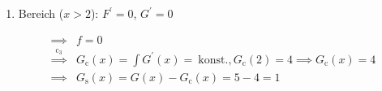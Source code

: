 \begin{solution}
\begin{enumerate}[label = \arabic*.]
    \item Bereich ($x > 2$):
    $F^\prime = 0$, $G^\prime = 0$

    \begin{align*}
        \implies & f = 0 \\
        \stackrel{\mathrm c_3}{\implies} & G_\mathrm{c}(x) = \int G^\prime(x) = ~\text{konst.}, G_\mathrm{c}(2) = 4 \implies G_\mathrm{c}(x) = 4 \\
        \implies & G_\mathrm{s}(x) = G(x) - G_\mathrm{c}(x) = 5 - 4 = 1
    \end{align*}

\end{enumerate}

\end{solution}

